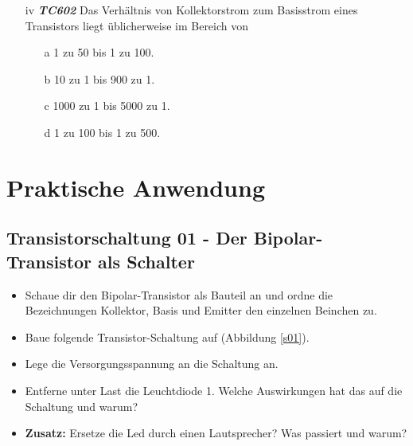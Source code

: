
\begin{enumerate} 
\item[iv] \emph{\textbf{TC602}}  Das Verhältnis von Kollektorstrom zum Basisstrom eines Transistors liegt üblicherweise im Bereich von
	\begin{enumerate}
	\itemsep1pt\parskip0pt
		\item[a] 1 zu 50 bis 1 zu 100.
		\item[b] 10 zu 1 bis 900 zu 1.
		\item[c] 1000 zu 1 bis 5000 zu 1.
		\item[d] 1 zu 100 bis 1 zu 500.
	\end{enumerate}
\end{enumerate}


\section{Praktische Anwendung}

\subsection[Der Bipolar-Transistor als Schalter]{Transistorschaltung 01 - Der Bipolar-Transistor als Schalter}

\begin{itemize}
\itemsep1pt\parskip0pt
\item Schaue dir den Bipolar-Transistor als Bauteil an und ordne die Bezeichnungen Kollektor, Basis und Emitter den einzelnen Beinchen zu.
\item Baue folgende Transistor-Schaltung auf (Abbildung \ref{s01}). 
\item Lege die Versorgungsspannung an die Schaltung an.
\item Entferne unter Last die Leuchtdiode 1. Welche Auswirkungen hat das auf die Schaltung und warum?
\item \textbf{Zusatz:} Ersetze die Led durch einen Lautsprecher? Was passiert und warum?
\end{itemize}

